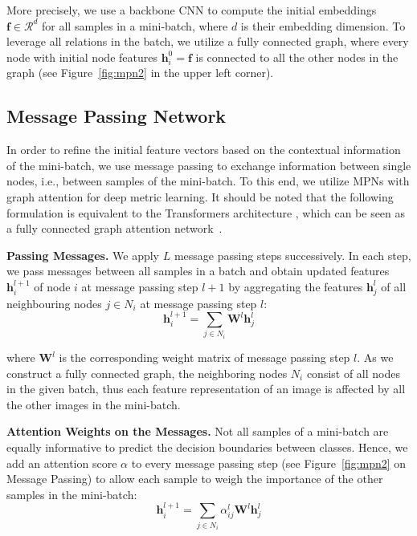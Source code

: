 \documentclass{article}
\begin{document}
More precisely, we use a backbone CNN to compute the initial embeddings $\boldsymbol{f} \in \mathcal{R}^{d}$ for all samples in a mini-batch, where ${d}$ is their embedding dimension. To leverage all relations in the batch, we utilize a fully connected graph, where every node with initial node features $\boldsymbol{h}_i^0= \boldsymbol{f}$ is connected to all the other nodes in the graph (see Figure~\ref{fig:mpn2} in the upper left corner). 
\vspace{-0.3cm}
\subsection{Message Passing Network}
\label{subsec:MPN}
In order to refine the initial feature vectors based on the contextual information of the mini-batch, we use message passing to exchange information between single nodes, i.e., between samples of the mini-batch. 
To this end, we utilize MPNs with graph attention \cite{DBLP:conf/iclr/VelickovicCCRLB18} for deep metric learning. It should be noted that the following formulation is equivalent to the Transformers architecture \cite{DBLP:conf/nips/VaswaniSPUJGKP17}, which can be seen as a fully connected graph attention network~\cite{DBLP:conf/iclr/VelickovicCCRLB18}.

\noindent\textbf{Passing Messages.} We apply $L$ message passing steps successively. In each step, we pass messages between all samples in a batch and obtain updated features $\boldsymbol{h}_i^{l+1}$ of node $i$ at message passing step $l+1$ by aggregating the features $\boldsymbol{h}_j^l$ of all neighbouring nodes $ j \in N_i$ at message passing step $l$:
\begin{equation}
    \boldsymbol{h}_i^{l+1} = \sum_{j \in N_i} \boldsymbol{W}^l\boldsymbol{h}_j^l
\end{equation}

where $\boldsymbol{W}^l$ is the corresponding weight matrix of message passing step $l$. As we construct a fully connected graph, the neighboring nodes $N_i$ consist of all nodes in the given batch, thus each feature representation of an image is affected by all the other images in the mini-batch.

\noindent\textbf{Attention Weights on the Messages.} Not all samples of a mini-batch are equally informative to predict the decision boundaries between classes. Hence, we add an attention score $\alpha$ to every message passing step (see Figure~\ref{fig:mpn2} on Message Passing) to allow each sample to weigh the importance of the other samples in the mini-batch:
\begin{equation}
    \boldsymbol{h}_i^{l+1} = \sum_{j \in N_i} \alpha_{ij}^l \boldsymbol{W}^l\boldsymbol{h}_j^l
\end{equation}
\end{document}
